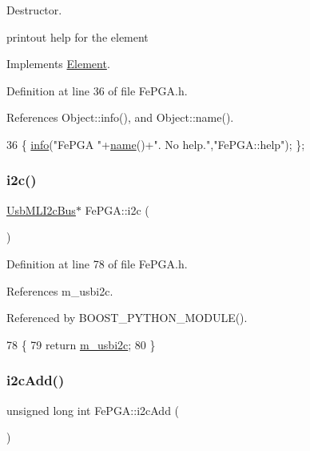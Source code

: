Destructor. 

printout help for the element 

Implements \hyperlink{classElement_a32c0de27acb08e17251cef88c3e9303a}{Element}.



Definition at line 36 of file Fe\+P\+G\+A.\+h.



References Object\+::info(), and Object\+::name().


\begin{DoxyCode}
36 \{ \hyperlink{classObject_a644fd329ea4cb85f54fa6846484b84a8}{info}(\textcolor{stringliteral}{"FePGA "}+\hyperlink{classObject_a300f4c05dd468c7bb8b3c968868443c1}{name}()+\textcolor{stringliteral}{". No help."},\textcolor{stringliteral}{"FePGA::help"}); \};
\end{DoxyCode}
\mbox{\label{classFePGA_a1553db5010cce9e3495aa3060baf0b3c}} 
\subsubsection{\texorpdfstring{i2c()}{i2c()}}
{\footnotesize\ttfamily \hyperlink{classUsbMLI2cBus}{Usb\+M\+L\+I2c\+Bus}$\ast$ Fe\+P\+G\+A\+::i2c (\begin{DoxyParamCaption}{ }\end{DoxyParamCaption})\hspace{0.3cm}{\ttfamily [inline]}}



Definition at line 78 of file Fe\+P\+G\+A.\+h.



References m\+\_\+usbi2c.



Referenced by B\+O\+O\+S\+T\+\_\+\+P\+Y\+T\+H\+O\+N\+\_\+\+M\+O\+D\+U\+L\+E().


\begin{DoxyCode}
78                     \{
79     \textcolor{keywordflow}{return} \hyperlink{classFePGA_a09fdde4002008daa0d15672772dd4483}{m\_usbi2c};
80   \}
\end{DoxyCode}
\mbox{\label{classFePGA_a26b690b730b5f668ab28fb8deab8326b}} 
\subsubsection{\texorpdfstring{i2c\+Add()}{i2cAdd()}}
{\footnotesize\ttfamily unsigned long int Fe\+P\+G\+A\+::i2c\+Add (\begin{DoxyParamCaption}{ }\end{DoxyParamCaption})}



